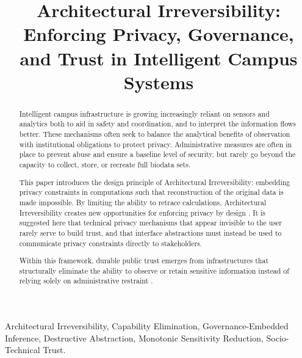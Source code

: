 \documentclass[conference]{IEEEtran}
\begin{document}
\title{Architectural Irreversibility: Enforcing Privacy, Governance, and Trust in Intelligent Campus Systems}

\author{
}

\maketitle

\begin{abstract}
Intelligent campus infrastructure is growing increasingly reliant on sensors and analytics both to aid in safety and coordination, and to interpret the information flows better. These mechanisms often seek to balance the analytical benefits of observation with institutional obligations to protect privacy. Administrative measures are often in place to prevent abuse and ensure a baseline level of security, but rarely go beyond the capacity to collect, store, or recreate full biodata sets.

This paper introduces the design principle of Architectural Irreversibility: embedding privacy constraints in computations such that reconstruction of the original data is made impossible. By limiting the ability to retrace calculations, Architectural Irreversibility creates new opportunities for enforcing privacy by design \cite{b23}. It is suggested here that technical privacy mechanisms that appear invisible to the user rarely serve to build trust, and that interface abstractions must instead be used to communicate privacy constraints directly to stakeholders.

Within this framework, durable public trust emerges from infrastructures that structurally eliminate the ability to observe or retain sensitive information instead of relying solely on administrative restraint \cite{b6}.
\end{abstract}

\begin{IEEEkeywords}
Architectural Irreversibility, Capability Elimination, Governance-Embedded Inference, Destructive Abstraction, Monotonic Sensitivity Reduction, Socio-Technical Trust.
\end{IEEEkeywords}
\end{document}
